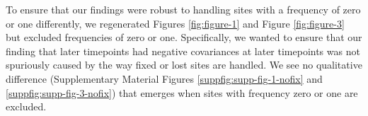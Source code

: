\documentclass[11pt]{article}
\begin{document}
To ensure that our findings were robust to handling sites with a frequency of
zero or one differently, we regenerated Figures \ref{fig:figure-1} and Figure
\ref{fig:figure-3} but excluded frequencies of zero or one. Specifically, we
wanted to ensure that our finding that later timepoints had negative
covariances at later timepoints was not spuriously caused by the way fixed or
lost sites are handled. We see no qualitative difference (Supplementary
Material Figures \ref{suppfig:supp-fig-1-nofix} and
\ref{suppfig:supp-fig-3-nofix}) that emerges when sites with frequency zero or
one are excluded.










\end{document}
